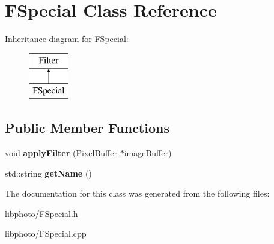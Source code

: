 \hypertarget{classFSpecial}{\section{F\-Special Class Reference}
\label{classFSpecial}
}
Inheritance diagram for F\-Special\-:\begin{figure}[H]
\begin{center}
\leavevmode
\includegraphics[height=2.000000cm]{classFSpecial}
\end{center}
\end{figure}
\subsection*{Public Member Functions}
\begin{DoxyCompactItemize}
\item 
\hypertarget{classFSpecial_ad5af4242e35da376aeb628e6a7cabc5e}{void {\bfseries apply\-Filter} (\hyperlink{classPixelBuffer}{Pixel\-Buffer} $\ast$image\-Buffer)}\label{classFSpecial_ad5af4242e35da376aeb628e6a7cabc5e}

\item 
\hypertarget{classFSpecial_a769159ff4dc9f6ebd64a6bbe5ae2e917}{std\-::string {\bfseries get\-Name} ()}\label{classFSpecial_a769159ff4dc9f6ebd64a6bbe5ae2e917}

\end{DoxyCompactItemize}


The documentation for this class was generated from the following files\-:\begin{DoxyCompactItemize}
\item 
libphoto/F\-Special.\-h\item 
libphoto/F\-Special.\-cpp\end{DoxyCompactItemize}
